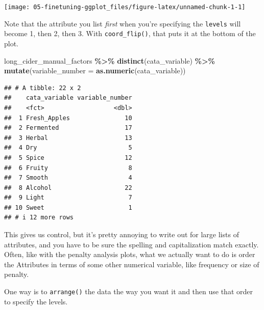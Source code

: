 \documentclass[
]{book}
\newenvironment{Shaded}{\begin{snugshade}}{\end{snugshade}}
\newcommand{\AttributeTok}[1]{\textcolor[rgb]{0.13,0.29,0.53}{#1}}
\newcommand{\FunctionTok}[1]{\textcolor[rgb]{0.13,0.29,0.53}{\textbf{#1}}}
\newcommand{\NormalTok}[1]{#1}
\newcommand{\SpecialCharTok}[1]{\textcolor[rgb]{0.81,0.36,0.00}{\textbf{#1}}}
\begin{document}
\begin{center}\texttt{[image: 05-finetuning-ggplot\_files/figure-latex/unnamed-chunk-1-1]} \end{center}

Note that the attribute you list \emph{first} when you're specifying the \texttt{levels} will become 1, then 2, then 3. With \texttt{coord\_flip()}, that puts it at the bottom of the plot.

\begin{Shaded}
\begin{Highlighting}[]
\NormalTok{long\_cider\_manual\_factors }\SpecialCharTok{\%\textgreater{}\%}
  \FunctionTok{distinct}\NormalTok{(cata\_variable) }\SpecialCharTok{\%\textgreater{}\%}
  \FunctionTok{mutate}\NormalTok{(}\AttributeTok{variable\_number =} \FunctionTok{as.numeric}\NormalTok{(cata\_variable))}
\end{Highlighting}
\end{Shaded}

\begin{verbatim}
## # A tibble: 22 x 2
##    cata_variable variable_number
##    <fct>                   <dbl>
##  1 Fresh_Apples               10
##  2 Fermented                  17
##  3 Herbal                     13
##  4 Dry                         5
##  5 Spice                      12
##  6 Fruity                      8
##  7 Smooth                      4
##  8 Alcohol                    22
##  9 Light                       7
## 10 Sweet                       1
## # i 12 more rows
\end{verbatim}

This gives us control, but it's pretty annoying to write out for large lists of attributes, and you have to be sure the spelling and capitalization match exactly. Often, like with the penalty analysis plots, what we actually want to do is order the Attributes in terms of some other numerical variable, like frequency or size of penalty.

One way is to \texttt{arrange()} the data the way you want it and then use that order to specify the levels.
\end{document}
